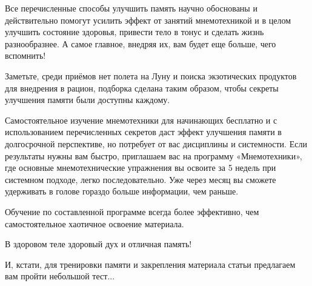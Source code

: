 Все перечисленные способы улучшить память научно обоснованы и действительно помогут усилить эффект от занятий мнемотехникой и в целом улучшить состояние здоровья, привести тело в тонус и сделать жизнь разнообразнее. А самое главное, внедряя их, вам будет еще больше, чего вспомнить!

Заметьте, среди приёмов нет полета на Луну и поиска экзотических продуктов для внедрения в рацион, подборка сделана таким образом, чтобы секреты улучшения памяти были доступны каждому.

Самостоятельное изучение мнемотехники для начинающих бесплатно и с использованием перечисленных секретов даст эффект улучшения памяти в долгосрочной перспективе, но потребует от вас дисциплины и системности. Если результаты нужны вам быстро, приглашаем вас на программу «Мнемотехники», где основные мнемотехнические упражнения вы освоите за 5 недель при системном подходе, легко последовательно. Уже через месяц вы сможете удерживать в голове гораздо больше информации, чем раньше.

Обучение по составленной программе всегда более эффективно, чем самостоятельное хаотичное освоение материала.

В здоровом теле здоровый дух и отличная память!

И, кстати, для тренировки памяти и закрепления материала статьи предлагаем вам пройти небольшой тест...